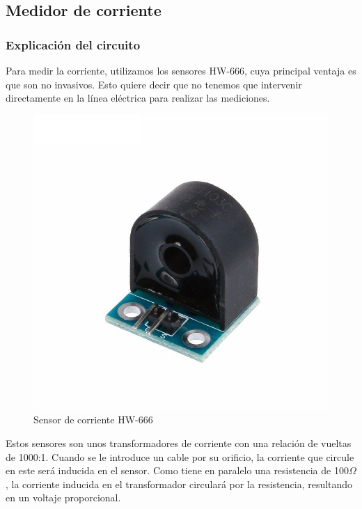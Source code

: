 \subsection{Medidor de corriente}

\subsubsection{Explicación del circuito}

Para medir la corriente, utilizamos los sensores HW-666, cuya principal ventaja es que son no invasivos. Esto quiere decir que no tenemos que intervenir directamente en la línea eléctrica para realizar las mediciones.\\

\begin{figure}
\includegraphics[width=0.9\linewidth]{hardware/hw666.jpg} 
\caption{Sensor de corriente HW-666}
\label{fig:hw666}
\end{figure}

Estos sensores son unos transformadores de corriente con una relación de vueltas de 1000:1. Cuando se le introduce un cable por su orificio, la corriente que circule en este será inducida en el sensor. Como tiene en paralelo una resistencia de 100$\Omega$, la corriente inducida en el transformador circulará por la resistencia, resultando en un voltaje proporcional.\\

